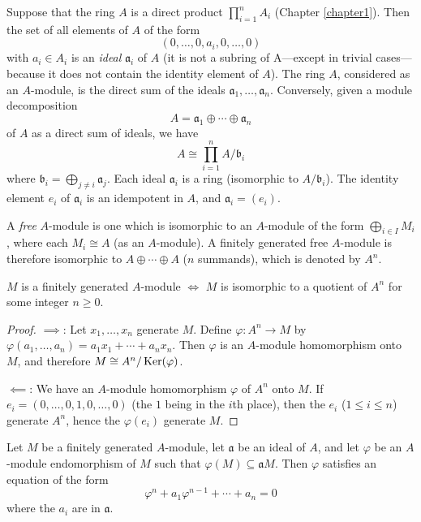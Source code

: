 Suppose that the ring $A$ is a direct product $\prod_{i=1}^n A_i$ (Chapter \ref{chapter1}). Then the set of all elements of $A$ of the form
\[
    (0, \ldots, 0, a_i, 0, \ldots, 0)
\]
with $a_i \in A_i$ is an \emph{ideal} $\mathfrak{a}_i$ of $A$ (it is not a subring of A---except in trivial cases---because it does not contain the identity element of $A$). The ring $A$, considered as an $A$-module, is the direct sum of the ideals $\mathfrak{a}_1, \ldots, \mathfrak{a}_n$. Conversely, given a module decomposition
\[
    A = \mathfrak{a}_1 \oplus \cdots \oplus \mathfrak{a}_n
\]
of $A$ as a direct sum of ideals, we have
\[
    A \cong \prod_{i=1}^n A/\mathfrak{b}_i
\]
where $\mathfrak{b}_i = \bigoplus_{j \neq i} \mathfrak{a}_j$. Each ideal $\mathfrak{a}_i$ is a ring (isomorphic to $A/\mathfrak{b}_i$). The identity element $e_i$ of $\mathfrak{a}_i$ is an idempotent in $A$, and $\mathfrak{a}_i = (e_i)$.


A \emph{free} $A$-module is one which is isomorphic to an $A$-module of the form $\bigoplus_{i \in I} M_i$, where each $M_i \cong A$ (as an $A$-module). A finitely generated free $A$-module is therefore isomorphic to $A \oplus \cdots \oplus A$ ($n$ summands), which is denoted by $A^n$.

\begin{proposition}\label{prop:finitely-generated-quotient}
$M$ is a finitely generated $A$-module $\iff$ $M$ is isomorphic to a quotient of $A^n$ for some integer $n \geq 0$.
\end{proposition}

\begin{proof}
    $\implies$: Let $x_1, \ldots, x_n$ generate $M$. Define $\varphi \colon A^n \to M$ by $\varphi(a_1, \ldots, a_n) = a_1 x_1 + \cdots + a_n x_n$. Then $\varphi$ is an $A$-module homomorphism onto $M$, and therefore $M \cong A^n/\operatorname{Ker}(\varphi)$.

    $\impliedby$: We have an $A$-module homomorphism $\varphi$ of $A^n$ onto $M$. If $e_i = (0, \ldots, 0, 1, 0, \ldots, 0)$ (the $1$ being in the $i$th place), then the $e_i$ ($1 \leq i \leq n$) generate $A^n$, hence the $\varphi(e_i)$ generate $M$.
\end{proof}

\begin{proposition}\label{prop:module-endomorphism-equation}
    Let $M$ be a finitely generated $A$-module, let $\mathfrak{a}$ be an ideal of $A$, and let $\varphi$ be an $A$-module endomorphism of $M$ such that $\varphi(M) \subseteq \mathfrak{a}M$. Then $\varphi$ satisfies an equation of the form
    \[
        \varphi^n + a_1 \varphi^{n-1} + \cdots + a_n = 0
    \]
    where the $a_i$ are in $\mathfrak{a}$.
\end{proposition}

